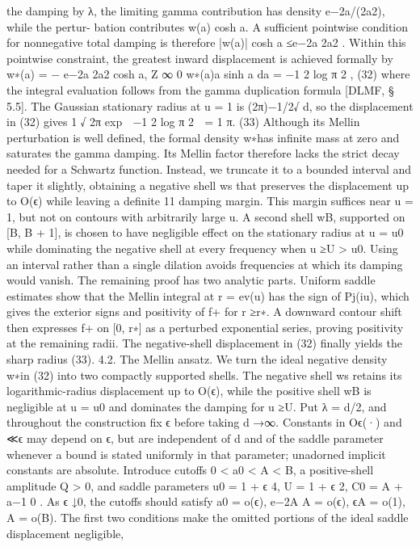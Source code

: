 the damping by λ, the limiting gamma contribution has density e−2a/(2a2), while the pertur-
bation contributes w(a) cosh a. A suﬃcient pointwise condition for nonnegative total damping
is therefore
|w(a)| cosh a ≤e−2a
2a2 .
Within this pointwise constraint, the greatest inward displacement is achieved formally by
w∗(a) = −
e−2a
2a2 cosh a,
Z ∞
0
w∗(a)a sinh a da = −1
2 log π
2 ,
(32)
where the integral evaluation follows from the gamma duplication formula [DLMF, § 5.5]. The
Gaussian stationary radius at u = 1 is (2π)−1/2√
d, so the displacement in (32) gives
1
√
2π exp

−1
2 log π
2

= 1
π.
(33)
Although its Mellin perturbation is well deﬁned, the formal density w∗has inﬁnite mass at
zero and saturates the gamma damping. Its Mellin factor therefore lacks the strict decay needed
for a Schwartz function. Instead, we truncate it to a bounded interval and taper it slightly,
obtaining a negative shell ws that preserves the displacement up to O(ϵ) while leaving a deﬁnite
11
damping margin. This margin suﬃces near u = 1, but not on contours with arbitrarily large u.
A second shell wB, supported on [B, B + 1], is chosen to have negligible eﬀect on the stationary
radius at u = u0 while dominating the negative shell at every frequency when u ≥U > u0.
Using an interval rather than a single dilation avoids frequencies at which its damping would
vanish.
The remaining proof has two analytic parts. Uniform saddle estimates show that the Mellin
integral at r = ev(u) has the sign of Pj(iu), which gives the exterior signs and positivity of f+
for r ≥r∗. A downward contour shift then expresses f+ on [0, r∗] as a perturbed exponential
series, proving positivity at the remaining radii. The negative-shell displacement in (32) ﬁnally
yields the sharp radius (33).
4.2. The Mellin ansatz. We turn the ideal negative density w∗in (32) into two compactly
supported shells. The negative shell ws retains its logarithmic-radius displacement up to O(ϵ),
while the positive shell wB is negligible at u = u0 and dominates the damping for u ≥U.
Put λ = d/2, and throughout the construction ﬁx ϵ before taking d →∞. Constants in Oϵ(·)
and ≪ϵ may depend on ϵ, but are independent of d and of the saddle parameter whenever a
bound is stated uniformly in that parameter; unadorned implicit constants are absolute.
Introduce cutoﬀs 0 < a0 < A < B, a positive-shell amplitude Q > 0, and saddle parameters
u0 = 1 + ϵ
4,
U = 1 + ϵ
2,
C0 = A + a−1
0 .
As ϵ ↓0, the cutoﬀs should satisfy
a0 = o(ϵ),
e−2A
A
= o(ϵ),
ϵA = o(1),
A = o(B).
The ﬁrst two conditions make the omitted portions of the ideal saddle displacement negligible,
